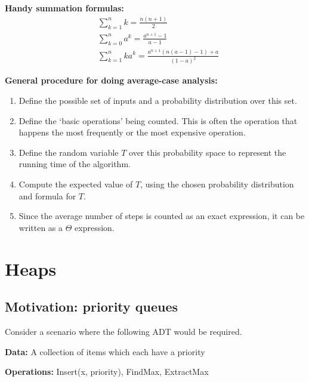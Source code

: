 \documentclass[11pt]{article}
\begin{document}
\textbf{Handy summation formulas:}
\begin{align*}
    &\sum_{k=1}^n k = \frac{n(n+1)}{2} \tag{arithmetic series} \\
    &\sum_{k=0}^n a^k = \frac{a^{n+1} -1}{a-1} \tag{geometric series} \\
    &\sum_{k=1}^n ka^k = \frac{a^{n+1}(n(a-1)-1)+a}{(1-a)^2} \tag{arithmetic-geometric series} 
\end{align*}

\newpage 

\textbf{General procedure for doing average-case analysis:}
\begin{enumerate}
    \item Define the possible set of inputs and a probability distribution over this set.
    \item Define the `basic operations' being counted. This is often the operation that happens the most frequently or the most expensive operation.
    \item Define the random variable $T$ over this probability space to represent the running time of the algorithm.
    \item Compute the expected value of $T$, using the chosen probability distribution and formula for $T$.
    \item Since the average number of steps is counted as an exact expression, it can be written as a $\Theta$ expression.
\end{enumerate}


\newpage 
\section{Heaps}

\subsection{Motivation: priority queues}
Consider a scenario where the following ADT would be required. 

\textbf{Data:} A collection of items which each have a priority 

\textbf{Operations:} Insert(x, priority), FindMax, ExtractMax
\end{document}
